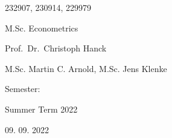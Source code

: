 \documentclass[11pt,a4paper]{article}
\begin{document}
\begin{titlepage}
  \noindent\begin{minipage}[t]{0.5\textwidth}
  \end{minipage}
  \begin{minipage}[t]{0.7\textwidth}
  \hspace{1cm}232907, 230914, 229979
  \end{minipage}

  \noindent\begin{minipage}[t]{0.5\textwidth}
  \end{minipage}
  \begin{minipage}[t]{0.7\textwidth}
  \hspace{1cm}M.Sc. Econometrics
  \end{minipage}

  \noindent\begin{minipage}[t]{0.5\textwidth}
  \end{minipage}
  \begin{minipage}[t]{0.7\textwidth}
  \hspace{1cm}Prof.~Dr.~Christoph Hanck
  \end{minipage}

  \noindent\begin{minipage}[t]{0.5\textwidth}
  \end{minipage}
  \begin{minipage}[t]{0.7\textwidth}
  \hspace{1cm}M.Sc. Martin C. Arnold, M.Sc. Jens Klenke
  \end{minipage}

  \noindent\begin{minipage}[t]{0.5\textwidth}
  Semester:
  \end{minipage}
  \begin{minipage}[t]{0.7\textwidth}
  \hspace{1cm}
  \end{minipage}

  \noindent\begin{minipage}[t]{0.5\textwidth}
  \end{minipage}
  \begin{minipage}[t]{0.7\textwidth}
  \hspace{1cm}Summer Term 2022
  \end{minipage}

  \noindent\begin{minipage}[t]{0.5\textwidth}
  \end{minipage}
  \begin{minipage}[t]{0.7\textwidth}
  \hspace{1cm}09. 09. 2022
  \end{minipage}

\end{titlepage}
\end{document}
